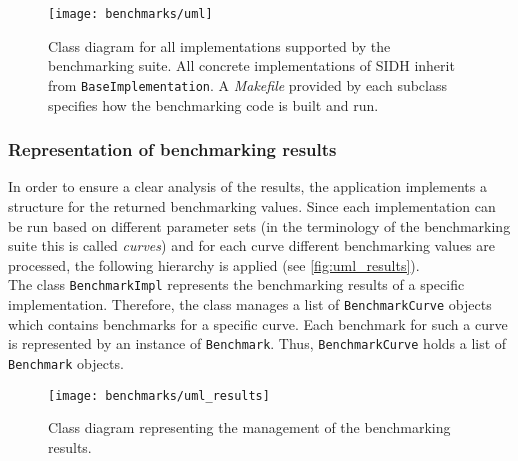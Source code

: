 \begin{figure}[H]
  \centering
  \texttt{[image: benchmarks/uml]}
  \caption[Class diagram for supported implementations]
  {Class diagram for all implementations supported by the benchmarking suite. All concrete implementations of \gls{SIDH} inherit from \texttt{BaseImplementation}. A \textit{Makefile} provided by each subclass specifies how the benchmarking code is built and run.} \label{fig:uml}
\end{figure}

\subsubsection{Representation of benchmarking results}
In order to ensure a clear analysis of the results, the application implements a structure for the returned benchmarking values. Since each implementation can be run based on different parameter sets (in the terminology of the benchmarking suite this is called \textit{curves}) and for each curve different benchmarking values are processed, the following hierarchy is applied (see \autoref{fig:uml_results}).\\
The class \texttt{BenchmarkImpl} represents the benchmarking results of a specific implementation. Therefore, the class manages a list of \texttt{BenchmarkCurve} objects which contains benchmarks for a specific curve. Each benchmark for such a curve is represented by an instance of \texttt{Benchmark}. Thus, \texttt{BenchmarkCurve} holds a list of \texttt{Benchmark} objects.
\begin{figure}[H]
  \centering
  \texttt{[image: benchmarks/uml\_results]}
  \caption[Class diagram for benchmarking results.]
  {Class diagram representing the management of the benchmarking results.}\label{fig:uml_results}
\end{figure}

